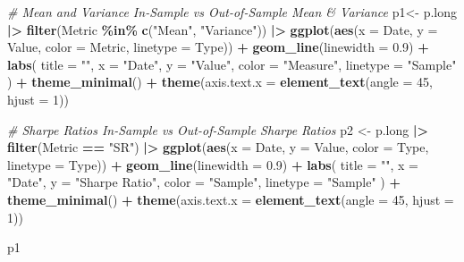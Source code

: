 \documentclass[
  12pt,
]{article}
\newenvironment{Shaded}{\begin{snugshade}}{\end{snugshade}}
\newcommand{\AttributeTok}[1]{\textcolor[rgb]{0.13,0.29,0.53}{#1}}
\newcommand{\CommentTok}[1]{\textcolor[rgb]{0.56,0.35,0.01}{\textit{#1}}}
\newcommand{\DecValTok}[1]{\textcolor[rgb]{0.00,0.00,0.81}{#1}}
\newcommand{\FloatTok}[1]{\textcolor[rgb]{0.00,0.00,0.81}{#1}}
\newcommand{\FunctionTok}[1]{\textcolor[rgb]{0.13,0.29,0.53}{\textbf{#1}}}
\newcommand{\NormalTok}[1]{#1}
\newcommand{\OtherTok}[1]{\textcolor[rgb]{0.56,0.35,0.01}{#1}}
\newcommand{\SpecialCharTok}[1]{\textcolor[rgb]{0.81,0.36,0.00}{\textbf{#1}}}
\newcommand{\StringTok}[1]{\textcolor[rgb]{0.31,0.60,0.02}{#1}}
\begin{document}
\begin{Shaded}
\begin{Highlighting}[]
\CommentTok{\# Mean and Variance In{-}Sample vs Out{-}of{-}Sample Mean \& Variance}
\NormalTok{p1}\OtherTok{\textless{}{-}}\NormalTok{ p.long }\SpecialCharTok{|\textgreater{}}
  \FunctionTok{filter}\NormalTok{(Metric }\SpecialCharTok{\%in\%} \FunctionTok{c}\NormalTok{(}\StringTok{"Mean"}\NormalTok{, }\StringTok{"Variance"}\NormalTok{)) }\SpecialCharTok{|\textgreater{}}
  \FunctionTok{ggplot}\NormalTok{(}\FunctionTok{aes}\NormalTok{(}\AttributeTok{x =}\NormalTok{ Date, }\AttributeTok{y =}\NormalTok{ Value, }\AttributeTok{color =}\NormalTok{ Metric, }\AttributeTok{linetype =}\NormalTok{ Type)) }\SpecialCharTok{+}
  \FunctionTok{geom\_line}\NormalTok{(}\AttributeTok{linewidth =} \FloatTok{0.9}\NormalTok{) }\SpecialCharTok{+}
  \FunctionTok{labs}\NormalTok{(}
    \AttributeTok{title =} \StringTok{""}\NormalTok{,}
    \AttributeTok{x =} \StringTok{"Date"}\NormalTok{, }\AttributeTok{y =} \StringTok{"Value"}\NormalTok{,}
    \AttributeTok{color =} \StringTok{"Measure"}\NormalTok{, }\AttributeTok{linetype =} \StringTok{"Sample"}
\NormalTok{  ) }\SpecialCharTok{+}
  \FunctionTok{theme\_minimal}\NormalTok{() }\SpecialCharTok{+}
  \FunctionTok{theme}\NormalTok{(}\AttributeTok{axis.text.x =} \FunctionTok{element\_text}\NormalTok{(}\AttributeTok{angle =} \DecValTok{45}\NormalTok{, }\AttributeTok{hjust =} \DecValTok{1}\NormalTok{))}

\CommentTok{\# Sharpe Ratios In{-}Sample vs Out{-}of{-}Sample Sharpe Ratios}
\NormalTok{p2 }\OtherTok{\textless{}{-}}\NormalTok{ p.long }\SpecialCharTok{|\textgreater{}}
  \FunctionTok{filter}\NormalTok{(Metric }\SpecialCharTok{==} \StringTok{"SR"}\NormalTok{) }\SpecialCharTok{|\textgreater{}}
  \FunctionTok{ggplot}\NormalTok{(}\FunctionTok{aes}\NormalTok{(}\AttributeTok{x =}\NormalTok{ Date, }\AttributeTok{y =}\NormalTok{ Value, }\AttributeTok{color =}\NormalTok{ Type, }\AttributeTok{linetype =}\NormalTok{ Type)) }\SpecialCharTok{+}
  \FunctionTok{geom\_line}\NormalTok{(}\AttributeTok{linewidth =} \FloatTok{0.9}\NormalTok{) }\SpecialCharTok{+}
  \FunctionTok{labs}\NormalTok{(}
    \AttributeTok{title =} \StringTok{""}\NormalTok{,}
    \AttributeTok{x =} \StringTok{"Date"}\NormalTok{, }\AttributeTok{y =} \StringTok{"Sharpe Ratio"}\NormalTok{,}
    \AttributeTok{color =} \StringTok{"Sample"}\NormalTok{, }\AttributeTok{linetype =} \StringTok{"Sample"}
\NormalTok{  ) }\SpecialCharTok{+}
  \FunctionTok{theme\_minimal}\NormalTok{() }\SpecialCharTok{+}
  \FunctionTok{theme}\NormalTok{(}\AttributeTok{axis.text.x =} \FunctionTok{element\_text}\NormalTok{(}\AttributeTok{angle =} \DecValTok{45}\NormalTok{, }\AttributeTok{hjust =} \DecValTok{1}\NormalTok{))}

\NormalTok{p1}
\end{Highlighting}
\end{Shaded}
\end{document}
